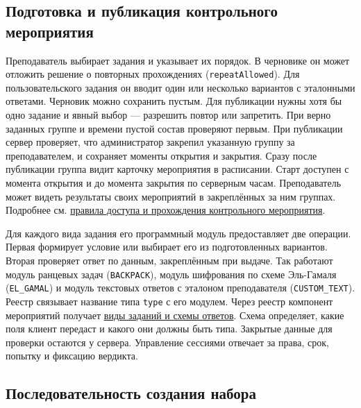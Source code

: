 \documentclass[12pt,a4paper]{article}
\begin{document}
\subsection{Подготовка и публикация контрольного мероприятия}\label{ux43fux43eux434ux433ux43eux442ux43eux432ux43aux430-ux438-ux43fux443ux431ux43bux438ux43aux430ux446ux438ux44f-ux43aux43eux43dux442ux440ux43eux43bux44cux43dux43eux433ux43e-ux43cux435ux440ux43eux43fux440ux438ux44fux442ux438ux44f}

\hypertarget{подготовка-и-публикация-контрольного-мероприятия}{}

Преподаватель выбирает задания и указывает их порядок. В черновике он может отложить решение о повторных прохождениях (\texttt{repeat\allowbreak{}Allowed}). Для пользовательского задания он вводит один или несколько вариантов с эталонными ответами. Черновик можно сохранить пустым. Для публикации нужны хотя бы одно задание и явный выбор --- разрешить повтор или запретить. При верно заданных группе и времени пустой состав проверяют первым. При публикации сервер проверяет, что администратор закрепил указанную группу за преподавателем, и сохраняет моменты открытия и закрытия. Сразу после публикации группа видит карточку мероприятия в расписании. Старт доступен с момента открытия и до момента закрытия по серверным часам. Преподаватель может видеть результаты своих мероприятий в закреплённых за ним группах. Подробнее см. {\href{../02\_Техническое\_задание/Техническое\_задание.pdf\#правила-доступа-и-прохождения-контрольного-мероприятия}{правила доступа и прохождения контрольного мероприятия}}.

Для каждого вида задания его программный модуль предоставляет две операции. Первая формирует условие или выбирает его из подготовленных вариантов. Вторая проверяет ответ по данным, закреплённым при выдаче. Так работают модуль ранцевых задач (\texttt{BACKPACK}), модуль шифрования по схеме Эль-Гамаля (\texttt{EL\_GAMAL}) и модуль текстовых ответов с эталоном преподавателя (\texttt{CUSTOM\_\allowbreak{}TEXT}). Реестр связывает название типа \texttt{type} с его модулем. Через реестр компонент мероприятий получает {\hyperlink{swr-sys-015-единый-интерфейс-вида-задания}{виды заданий и схемы ответов}}. Схема определяет, какие поля клиент передаст и какого они должны быть типа. Закрытые данные для проверки остаются у сервера. Управление сессиями отвечает за права, срок, попытку и фиксацию вердикта.

\subsection{Последовательность создания набора}\label{ux43fux43eux441ux43bux435ux434ux43eux432ux430ux442ux435ux43bux44cux43dux43eux441ux442ux44c-ux441ux43eux437ux434ux430ux43dux438ux44f-ux43dux430ux431ux43eux440ux430}
\end{document}
